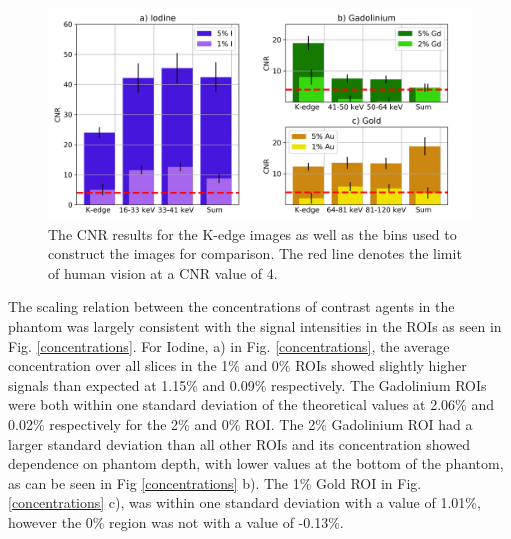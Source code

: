 \documentclass[journal, a4paper]{IEEEtran}
\begin{document}
\begin{figure}[!h]

\includegraphics[width=\linewidth]{Figures/contrast_all.png}

\caption{The CNR results for the K-edge images as well as the bins used to construct the images for comparison. The red line denotes the limit of human vision at a CNR value of 4.}
\label{contrast_all}

\end{figure}

The scaling relation between the concentrations of contrast agents in the phantom was largely consistent with the signal intensities in the ROIs as seen in Fig. \ref{concentrations}. For Iodine, a) in Fig. \ref{concentrations}, the average concentration over all slices in the 1\% and 0\% ROIs showed slightly higher signals than expected at 1.15\% and 0.09\% respectively. The Gadolinium ROIs were both within one standard deviation of the theoretical values at 2.06\% and 0.02\% respectively for the 2\% and 0\% ROI. The 2\% Gadolinium ROI had a larger standard deviation than all other ROIs and its concentration showed dependence on phantom depth, with lower values at the bottom of the phantom, as can be seen in Fig \ref{concentrations} b). The 1\% Gold ROI in Fig. \ref{concentrations} c), was within one standard deviation with a value of 1.01\%, however the 0\% region was not with a value of -0.13\%.
\end{document}
